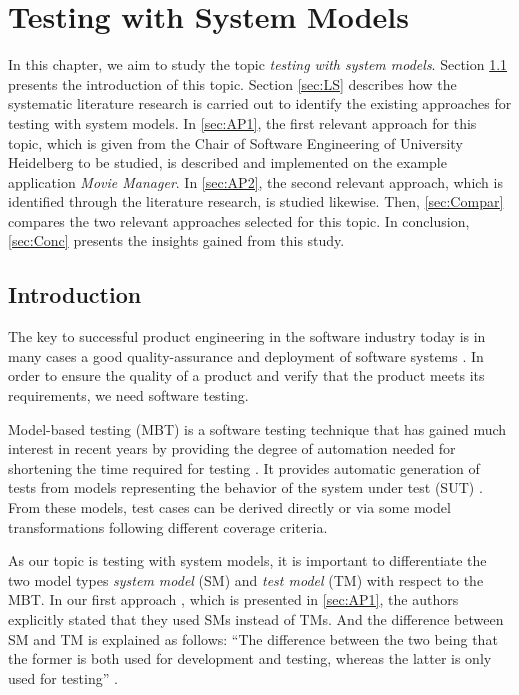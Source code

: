 \chapter{Testing with System Models}
\label{sec:topic_7}

In this chapter, we aim to study the topic \textit{testing with  system models}. Section \ref{sec:Intro7} presents the introduction of this topic. Section \ref{sec:LS} describes how the systematic literature research is carried out to identify the existing approaches for testing with system models. In \autoref{sec:AP1}, the first relevant approach for this topic, which is given from the Chair of Software Engineering of University Heidelberg to be studied, is described and implemented on the example application \textit{Movie Manager}. In \autoref{sec:AP2}, the second relevant approach, which is identified through the literature research, is studied likewise. Then, \autoref{sec:Compar} compares the two relevant approaches selected for this topic. In conclusion, \autoref{sec:Conc} presents the insights gained from this study.

\section{Introduction}
\label{sec:Intro7}

The key to successful product engineering in the software industry today is in many cases a good quality-assurance and deployment of software systems \cite{Paper1}. In order to ensure the quality of a product and verify that the product meets its requirements, we need software testing. 

Model-based testing (MBT) is a software testing technique that has gained much interest in recent years by providing the degree of automation needed for shortening the time required for testing \cite{Paper1}. It provides automatic generation of tests from models representing the behavior of the system under test (SUT) \cite{matera}. From these models, test cases can be derived directly or via some model transformations following different coverage criteria. 

As our topic is testing with system models, it is important to differentiate the two model types \textit{system model} (SM) and \textit{test model} (TM) with respect to the MBT. In our first approach \cite{Paper1}, which is presented in \autoref{sec:AP1}, the authors explicitly stated that they used SMs instead of TMs. And the difference between SM and TM is explained as follows: \enquote{The difference between the two being that the former is both used for development and testing, whereas the latter is only used for testing} \cite{Paper1}. 


